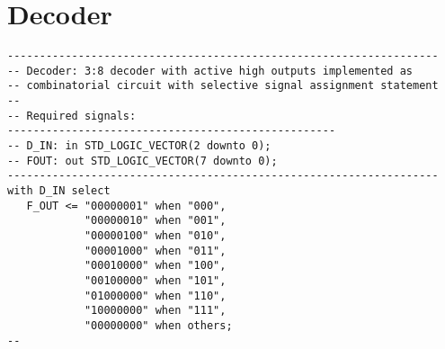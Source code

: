 \section{Decoder}
\noindent
\begin{minipage}{1\linewidth}
\begin{lstlisting}
-------------------------------------------------------------------
-- Decoder: 3:8 decoder with active high outputs implemented as
-- combinatorial circuit with selective signal assignment statement
--
-- Required signals: 
---------------------------------------------------
-- D_IN: in STD_LOGIC_VECTOR(2 downto 0); 
-- FOUT: out STD_LOGIC_VECTOR(7 downto 0); 
-------------------------------------------------------------------
with D_IN select
   F_OUT <= "00000001" when "000",
            "00000010" when "001",
            "00000100" when "010",
            "00001000" when "011",
            "00010000" when "100",
            "00100000" when "101",
            "01000000" when "110",
            "10000000" when "111",
            "00000000" when others;
--
\end{lstlisting}
\end{minipage}














